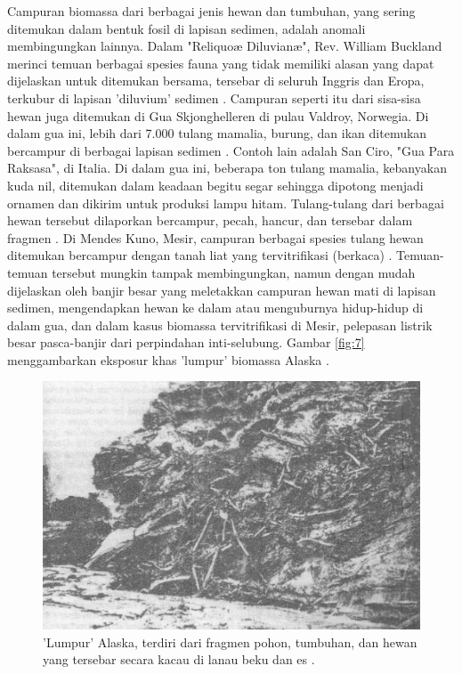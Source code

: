 \documentclass[10pt,twocolumn,letterpaper]{article}
\begin{document}
Campuran biomassa dari berbagai jenis hewan dan tumbuhan, yang sering ditemukan dalam bentuk fosil di lapisan sedimen, adalah anomali membingungkan lainnya. Dalam "Reliquoæ Diluvianæ", Rev. William Buckland merinci temuan berbagai spesies fauna yang tidak memiliki alasan yang dapat dijelaskan untuk ditemukan bersama, tersebar di seluruh Inggris dan Eropa, terkubur di lapisan 'diluvium' sedimen \cite{58}. Campuran seperti itu dari sisa-sisa hewan juga ditemukan di Gua Skjonghelleren di pulau Valdroy, Norwegia. Di dalam gua ini, lebih dari 7.000 tulang mamalia, burung, dan ikan ditemukan bercampur di berbagai lapisan sedimen \cite{59}. Contoh lain adalah San Ciro, "Gua Para Raksasa", di Italia. Di dalam gua ini, beberapa ton tulang mamalia, kebanyakan kuda nil, ditemukan dalam keadaan begitu segar sehingga dipotong menjadi ornamen dan dikirim untuk produksi lampu hitam. Tulang-tulang dari berbagai hewan tersebut dilaporkan bercampur, pecah, hancur, dan tersebar dalam fragmen \cite{60,61}. Di Mendes Kuno, Mesir, campuran berbagai spesies tulang hewan ditemukan bercampur dengan tanah liat yang tervitrifikasi (berkaca) \cite{57}. Temuan-temuan tersebut mungkin tampak membingungkan, namun dengan mudah dijelaskan oleh banjir besar yang meletakkan campuran hewan mati di lapisan sedimen, mengendapkan hewan ke dalam atau menguburnya hidup-hidup di dalam gua, dan dalam kasus biomassa tervitrifikasi di Mesir, pelepasan listrik besar pasca-banjir dari perpindahan inti-selubung. Gambar \ref{fig:7} menggambarkan eksposur khas 'lumpur' biomassa Alaska \cite{56}.

\begin{figure}[t]
\begin{center}
   \includegraphics[width=1\linewidth]{muck-crop.jpeg}
\end{center}
   \caption{'Lumpur' Alaska, terdiri dari fragmen pohon, tumbuhan, dan hewan yang tersebar secara kacau di lanau beku dan es \cite{146}.}
\label{fig:7}
\label{fig:onecol}
\end{figure}
\end{document}

